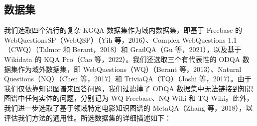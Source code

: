\documentclass[11pt,UTF8,fontset=fandol]{ctexart}
\begin{document}
\subsection{数据集}

我们选取四个流行的复杂 KGQA 数据集作为域内数据集，即基于 Freebase 的 WebQuestionsSP（WebQSP）（Yih 等，2016）、Complex WebQuestions 1.1（CWQ）（Talmor 和 Berant，2018）和 GrailQA（Gu 等，2021），以及基于 Wikidata 的 KQA Pro（Cao 等，2022）。我们还选取三个有代表性的 ODQA 数据集作为域外数据集，即 WebQuestions（WQ）（Berant 等，2013）、Natural Questions（NQ）（Chen 等，2017）和 TriviaQA（TQ）（Joshi 等，2017）。由于我们仅依靠知识图谱来回答问题，我们过滤掉了 ODQA 数据集中无法链接到知识图谱中任何实体的问题，分别记为 WQ-Freebase、NQ-Wiki 和 TQ-Wiki。此外，我们进一步选取了基于领域特定电影知识图谱的 MetaQA（Zhang 等，2018），以评估我们方法的通用性。所选数据集的详细描述如下：
\end{document}
